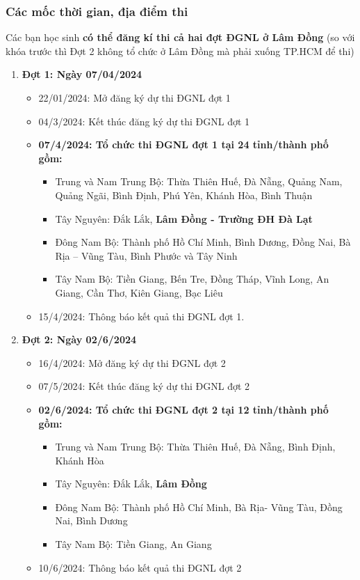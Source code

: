 \subsubsection{Các mốc thời gian, địa điểm thi} 
\label{sec:thoigiandiadiem}
Các bạn học sinh \textbf{có thể đăng kí thi cả hai đợt ĐGNL ở Lâm Đồng} \cite{thoigian_diadiem} (so với khóa trước thì Đợt 2 không tổ chức ở Lâm Đồng mà phải xuống TP.HCM để thi)
\begin{enumerate}
    \item \textbf{Đợt 1: Ngày 07/04/2024}
    \begin{itemize}
        \item 22/01/2024: Mở đăng ký dự thi ĐGNL đợt 1
        \item 04/3/2024: Kết thúc đăng ký dự thi ĐGNL đợt 1
        \item \textbf{07/4/2024: Tổ chức thi ĐGNL đợt 1 tại 24 tỉnh/thành phố gồm:}
        \begin{itemize}
            \item Trung và Nam Trung Bộ: Thừa Thiên Huế, Đà Nẵng, Quảng Nam, Quảng Ngãi, Bình Định, Phú Yên, Khánh Hòa, Bình Thuận
            \item Tây Nguyên: Đắk Lắk, \textbf{Lâm Đồng - Trường ĐH Đà Lạt}
            \item Đông Nam Bộ: Thành phố Hồ Chí Minh, Bình Dương, Đồng Nai, Bà Rịa – Vũng Tàu, Bình Phước và Tây Ninh
            \item Tây Nam Bộ: Tiền Giang, Bến Tre, Đồng Tháp, Vĩnh Long, An Giang, Cần Thơ, Kiên Giang, Bạc Liêu
        \end{itemize}
        \item 15/4/2024: Thông báo kết quả thi ĐGNL đợt 1.
    \end{itemize}
    \item \textbf{Đợt 2: Ngày 02/6/2024}
    \begin{itemize}
        \item 16/4/2024: Mở đăng ký dự thi ĐGNL đợt 2
        \item 07/5/2024: Kết thúc đăng ký dự thi ĐGNL đợt 2
        \item \textbf{02/6/2024: Tổ chức thi ĐGNL đợt 2 tại 12 tỉnh/thành phố gồm:}
        \begin{itemize}
            \item Trung và Nam Trung Bộ: Thừa Thiên Huế, Đà Nẵng, Bình Định, Khánh Hòa
            \item Tây Nguyên: Đắk Lắk, \textbf{Lâm Đồng}
            \item Đông Nam Bộ: Thành phố Hồ Chí Minh, Bà Rịa- Vũng Tàu, Đồng Nai, Bình Dương
            \item Tây Nam Bộ: Tiền Giang, An Giang
        \end{itemize}
        \item 10/6/2024: Thông báo kết quả thi ĐGNL đợt 2
    \end{itemize}
\end{enumerate}

